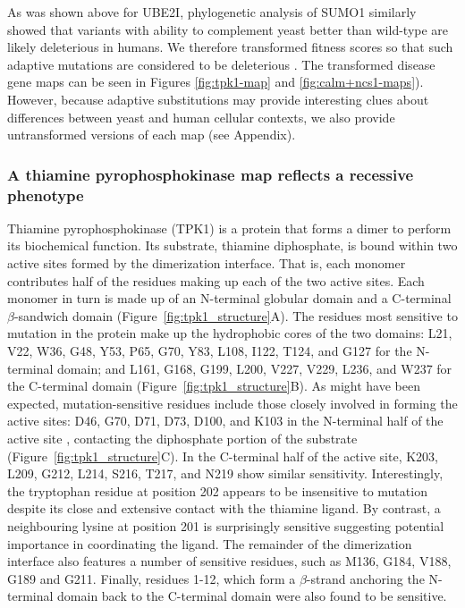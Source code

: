 As was shown above for UBE2I, phylogenetic analysis of SUMO1 similarly showed that variants with ability to complement yeast better than wild-type are likely deleterious in humans. We therefore transformed fitness scores so that such adaptive mutations are considered to be deleterious . The transformed disease gene maps can be seen in Figures \ref{fig:tpk1-map} and \ref{fig:calm+ncs1-maps}).  However, because adaptive substitutions may provide interesting clues about differences between yeast and human cellular contexts, we also provide untransformed versions of each map (see Appendix).



\subsubsection{A thiamine pyrophosphokinase map reflects a recessive phenotype}

Thiamine pyrophosphokinase (TPK1) is a protein that forms a dimer to perform its biochemical function. Its substrate, thiamine diphosphate, is bound within two active sites formed by the dimerization interface\cite{timm_crystal_2001}. That is, each monomer contributes half of the residues making up each of the two active sites.  Each monomer in turn is made up of an N-terminal globular domain and a C-terminal $\beta$-sandwich domain (Figure~\ref{fig:tpk1_structure}A). The residues most sensitive to mutation in the protein make up the hydrophobic cores of the two domains: L21, V22, W36, G48, Y53, P65, G70, Y83, L108, I122, T124, and G127 for the N-terminal domain; and L161, G168, G199, L200, V227, V229, L236, and W237 for the C-terminal domain (Figure~\ref{fig:tpk1_structure}B). As might have been expected, mutation-sensitive residues include those closely involved in forming the active sites: D46, G70, D71, D73, D100, and K103 in the N-terminal half of the active site , contacting the diphosphate portion of the substrate (Figure~\ref{fig:tpk1_structure}C). In the C-terminal half of the active site, K203, L209, G212, L214, S216, T217, and N219 show similar sensitivity. Interestingly, the tryptophan residue at position 202 appears to be insensitive to mutation despite its close and extensive contact with the thiamine ligand. By contrast, a neighbouring lysine at position 201 is surprisingly sensitive suggesting potential importance in coordinating the ligand.  The remainder of the dimerization interface also features a number of sensitive residues, such as M136, G184, V188, G189 and G211. Finally, residues 1-12, which form a $\beta$-strand anchoring the N-terminal domain back to the C-terminal domain were also found to be sensitive.

